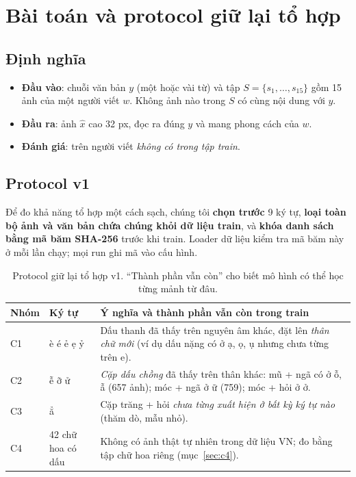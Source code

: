 \documentclass[11pt,a4paper]{article}
\begin{document}
\section{Bài toán và protocol giữ lại tổ hợp}
\label{sec:protocol}

\subsection{Định nghĩa}
\begin{itemize}
\item \textbf{Đầu vào}: chuỗi văn bản $y$ (một hoặc vài từ) và tập $S=\{s_1,\dots,s_{15}\}$ gồm 15 ảnh của một người viết $w$. Không ảnh nào trong $S$ có cùng nội dung với $y$.
\item \textbf{Đầu ra}: ảnh $\hat x$ cao 32 px, đọc ra đúng $y$ và mang phong cách của $w$.
\item \textbf{Đánh giá}: trên người viết \emph{không có trong tập train}.
\end{itemize}

\subsection{Protocol v1}
Để đo khả năng tổ hợp một cách sạch, chúng tôi \textbf{chọn trước} 9 ký tự, \textbf{loại toàn bộ ảnh và văn bản chứa chúng khỏi dữ liệu train}, và \textbf{khóa danh sách bằng mã băm SHA-256} trước khi train. Loader dữ liệu kiểm tra mã băm này ở mỗi lần chạy; mọi run ghi mã vào cấu hình.

\begin{table}[h]
\centering\small
\caption{Protocol giữ lại tổ hợp v1. ``Thành phần vẫn còn'' cho biết mô hình có thể học từng mảnh từ đâu.}
\label{tab:protocol}
\begin{tabularx}{\linewidth}{llX}
\toprule
Nhóm & Ký tự & Ý nghĩa và thành phần vẫn còn trong train \\
\midrule
C1 & è é ẻ ẹ ỷ & Dấu thanh đã thấy trên nguyên âm khác, đặt lên \emph{thân chữ mới} (ví dụ dấu nặng có ở ạ, ọ, ụ nhưng chưa từng trên e). \\
C2 & ễ ỡ ử & \emph{Cặp dấu chồng} đã thấy trên thân khác: mũ + ngã có ở ỗ, ẫ (657 ảnh); móc + ngã ở ữ (759); móc + hỏi ở ở. \\
C3 & ẳ & Cặp trăng + hỏi \emph{chưa từng xuất hiện ở bất kỳ ký tự nào} (thăm dò, mẫu nhỏ). \\
C4 & 42 chữ hoa có dấu & Không có ảnh thật tự nhiên trong dữ liệu VN; đo bằng tập chữ hoa riêng (mục~\ref{sec:c4}). \\
\bottomrule
\end{tabularx}
\end{table}
\end{document}
